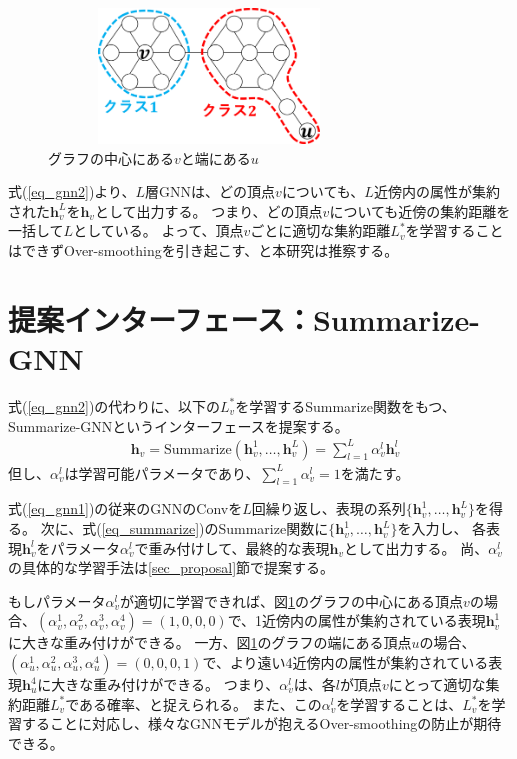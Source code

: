 \documentclass[a4j,twocolumn]{jsarticle}
\begin{document}
\begin{figure}[!h]
  \centering
  \includegraphics[height=3.6cm,width=8.5cm]{example1.pdf}
  \vspace{-6mm}
  \caption{グラフの中心にある$v$と端にある$u$}
  \label{fig_example1}
\end{figure}

\vspace{-3mm}
式(\ref{eq_gnn2})より、$L$層GNN\cite{Kipf}\cite{Velickovic}は、どの頂点$v$についても、$L$近傍内の属性が集約された$\bm{h}_v^L$を$\bm{h}_v$として出力する。
つまり、どの頂点$v$についても近傍の集約距離を一括して$L$としている。
よって、頂点$v$ごとに適切な集約距離$L_v^*$を学習することはできずOver-smoothingを引き起こす、と本研究は推察する。

\vspace{+1mm}
\section{提案インターフェース：Summarize-GNN}
\label{sec_interface}
\vspace{-1mm}

式(\ref{eq_gnn2})の代わりに、以下の$L_v^*$を学習するSummarize関数をもつ、Summarize-GNNというインターフェースを提案する。\vspace{-1mm}
\begin{align}
  & \bm{h}_v   = \text{Summarize}(\bm{h}_v^1,\ldots,\bm{h}_v^L) = \sum_{l=1}^L \alpha_v^l \bm{h}_v^l \label{eq_summarize}
\end{align}
但し、$\alpha_v^l$は学習可能パラメータであり、$\sum_{l=1}^L \alpha_v^l=1$を満たす。

式(\ref{eq_gnn1})の従来のGNNのConvを$L$回繰り返し、表現の系列$\{\bm{h}_v^1,\ldots,\bm{h}_v^L\}$を得る。
次に、式(\ref{eq_summarize})のSummarize関数に$\{\bm{h}_v^1,\ldots,\bm{h}_v^L\}$を入力し、
各表現$\bm{h}_v^l$をパラメータ$\alpha_v^l$で重み付けして、最終的な表現$\bm{h}_v$として出力する。
尚、$\alpha_v^l$の具体的な学習手法は\ref{sec_proposal}節で提案する。

もしパラメータ$\alpha_v^l$が適切に学習できれば、図\ref{fig_example1}のグラフの中心にある頂点$v$の場合、$(\alpha_v^1,\alpha_v^2,\alpha_v^3,\alpha_v^4)=(1,0,0,0)$で、1近傍内の属性が集約されている表現$\bm{h}_v^1$に大きな重み付けができる。
一方、図\ref{fig_example1}のグラフの端にある頂点$u$の場合、$(\alpha_u^1,\alpha_u^2,\alpha_u^3,\alpha_u^4)=(0,0,0,1)$で、より遠い4近傍内の属性が集約されている表現$\bm{h}_u^4$に大きな重み付けができる。
つまり、$\alpha_v^l$は、各$l$が頂点$v$にとって適切な集約距離$L_v^*$である確率、と捉えられる。
また、この$\alpha_v^l$を学習することは、$L_v^*$を学習することに対応し、様々なGNNモデルが抱えるOver-smoothingの防止が期待できる。
\end{document}
